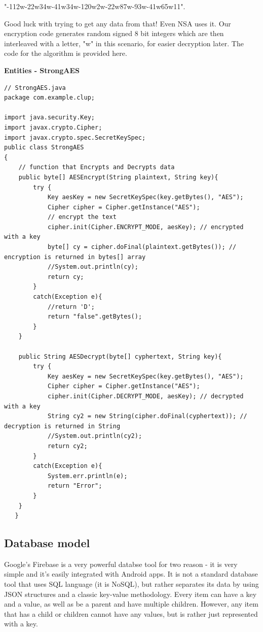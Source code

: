 "-112w-22w34w-41w34w-120w2w-22w87w-93w-41w65w11".\newline

Good luck with trying to get any data from that! Even NSA uses it.
Our encryption code generates random signed 8 bit integers which are then interleaved with a letter, "w" in this scenario, for easier decryption later. The code for the algorithm is provided here.\newline

\textbf{Entities - StrongAES}

\begin{lstlisting}
// StrongAES.java
package com.example.clup;

import java.security.Key;
import javax.crypto.Cipher;
import javax.crypto.spec.SecretKeySpec;
public class StrongAES
{
    // function that Encrypts and Decrypts data
    public byte[] AESEncrypt(String plaintext, String key){
        try {
            Key aesKey = new SecretKeySpec(key.getBytes(), "AES");
            Cipher cipher = Cipher.getInstance("AES");
            // encrypt the text
            cipher.init(Cipher.ENCRYPT_MODE, aesKey); // encrypted with a key
            byte[] cy = cipher.doFinal(plaintext.getBytes()); // encryption is returned in bytes[] array
            //System.out.println(cy);
            return cy;
        }
        catch(Exception e){
            //return 'D';
            return "false".getBytes();
        }
    }

    public String AESDecrypt(byte[] cyphertext, String key){
        try {
            Key aesKey = new SecretKeySpec(key.getBytes(), "AES");
            Cipher cipher = Cipher.getInstance("AES");
            cipher.init(Cipher.DECRYPT_MODE, aesKey); // decrypted with a key
            String cy2 = new String(cipher.doFinal(cyphertext)); // decryption is returned in String
            //System.out.println(cy2);
            return cy2;
        }
        catch(Exception e){
            System.err.println(e);
            return "Error";
        }
    }
   }
\end{lstlisting}


\subsection{Database model}
\hspace{\parindent} Google's Firebase is a very powerful databse tool for two reason - it is very simple and it's easily integrated with Android apps. It is not a standard database tool that uses SQL language (it is NoSQL), but rather separates its data by using JSON structures and a classic key-value methodology. Every item can have a key and a value, as well as be a parent and have multiple children. However, any item that has a child or children cannot have any values, but is rather just represented with a key. \newline

